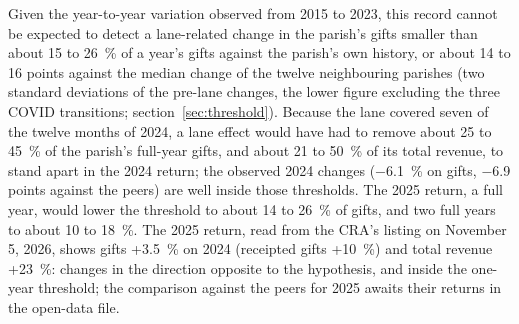 Given the year-to-year variation observed from 2015 to 2023, this record cannot be expected to detect a lane-related change in the parish's gifts smaller than about 15 to 26~\% of a year's gifts against the parish's own history, or about 14 to 16 points against the median change of the twelve neighbouring parishes (two standard deviations of the pre-lane changes, the lower figure excluding the three COVID transitions; section~\ref{sec:threshold}). Because the lane covered seven of the twelve months of 2024, a lane effect would have had to remove about 25 to 45~\% of the parish's full-year gifts, and about 21 to 50~\% of its total revenue, to stand apart in the 2024 return; the observed 2024 changes ($-$6.1~\% on gifts, $-$6.9 points against the peers) are well inside those thresholds. The 2025 return, a full year, would lower the threshold to about 14 to 26~\% of gifts, and two full years to about 10 to 18~\%. The 2025 return, read from the CRA's listing on November 5, 2026, shows gifts +3.5~\% on 2024 (receipted gifts +10~\%) and total revenue +23~\%: changes in the direction opposite to the hypothesis, and inside the one-year threshold; the comparison against the peers for 2025 awaits their returns in the open-data file.
